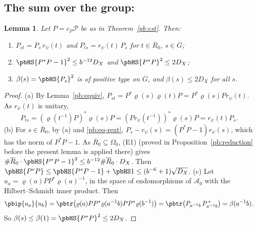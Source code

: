 \documentclass[10pt]{amsart}
\newtheorem{lemma}[theorem]{Lemma}
\theoremstyle{definition}
\theoremstyle{remark}
\providecommand{\auAz}{\mathcal A_0}
\providecommand{\auDX}{D_X}
\providecommand{\auG}{\overline G}
\providecommand{\auP}{\mathcal P}
\providecommand{\pbR}{\overline R_0}
\providecommand{\pbrpsi}{r_\psi}
\begin{document}
\subsection{The sum over the group: \texorpdfstring{{\cite[Proposition~14.32(iii)]{P46}}}{[Row D, Proposition~14.32(iii)]}}\label{pb:ss-iii}

\begin{lemma}\label{pb:basic}
Let $P=c_P\auP$ be as in Theorem~\ref{pb:est}. Then:
\begin{enumerate}
\item[(a)] $P_{st}=P_s\,\pbrpsi(t)$ and $P_{ts}=\pbrpsi(t)\,P_s$ for $t\in\pbR$, $s\in\auG$;
\item[(b)] $\pbHS{P^*P-1}^2\le b^{-12}\auDX$ and $\pbHS{P^*P}^2\le2\auDX$;
\item[(c)] $\beta(s)=\pbHS{P_s}^2$ is of positive type on $\auG$, and $\beta(s)\le2\auDX$ for all
$s$.
\end{enumerate}
\end{lemma}
\begin{proof}
(a) By Lemma~\ref{pb:equiv}, $P_{st}=P^*\varrho(s)\varrho(t)P=P^*\varrho(s)P\pbrpsi(t)$. As
$\pbrpsi(t)$ is unitary,
\[
P_{ts}=(\varrho(t^{-1})P)^*\varrho(s)P=(P\pbrpsi(t^{-1}))^*\varrho(s)P=\pbrpsi(t)P_s .
\] (b) For $s\in\pbR$, by (a) and \eqref{pb:eq-rext}, $P_s-\pbrpsi(s)=(P^*P
-1)\pbrpsi(s)$, which has the norm of $P^*P-1$. As $\pbR\subseteq\Omega_0$, (E1) (proved in Proposition~\ref{pb:reduction} before the present lemma is applied there) gives $\#\pbR
\cdot\pbHS{P^*P-1}^2\le b^{-12}\#\pbR\cdot\auDX$. Then
$\pbHS{P^*P}\le\pbHS{P^*P-1}+\pbHS1\le(b^{-6}+1)\sqrt{\auDX}$. (c) Let $u_a=\varrho(a)PP^*\varrho(a)^{-1}$, in the space of endomorphisms of
$\auAz$ with the Hilbert--Schmidt inner product. Then
\[
\pbip{u_a}{u_b}=\pbtr\bigl(\varrho(a)PP^*\varrho(a^{-1}b)PP^*\varrho(b^{-1})\bigr)=\pbtr\bigl(P_{a^{-1}
b}\,P_{a^{-1}b}^{\,*}\bigr)=\beta(a^{-1}b) .
\]
So $\beta(s)\le\beta(1)=\pbHS{P^*P}^2\le2\auDX$.
\end{proof}
\end{document}

